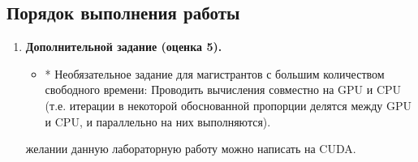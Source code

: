{ %
	\subsection{Порядок выполнения работы}
	\begin{enumerate}
		 необходимо реализовать один (для оценки 3) или два (для оценки 4) этапа вашей программы из предыдущих лабораторных работ. При этом вычисления можно проводить как на CPU, так и на GPU (на своё усмотрение, но GPU предпочтительнее).
		\item\textbf{Дополнительной задание (оценка 5).}
			\begin{itemize}
				 заданий для оценки 3 и 4.
				 доверительного интервала. 
				 время 2 способами: с помощью profiling и с помощью обычного замера (как в предыдущих заданиях).
				 накладные расходы.
				\item* Необязательное задание для магистрантов с большим количеством свободного времени: Проводить вычисления совместно на GPU и CPU (т.е. итерации в некоторой обоснованной пропорции делятся между GPU и CPU, и параллельно на них выполняются).
			\end{itemize}
		 желании данную лабораторную работу можно написать на CUDA.
	\end{enumerate}
}